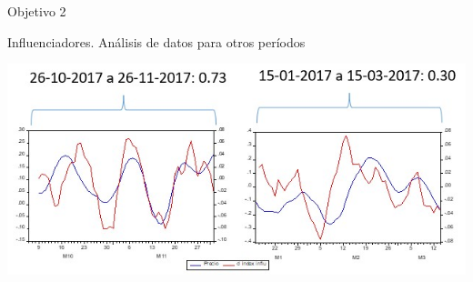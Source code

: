 
\begin{frame}
\huge
\centering
    Objetivo 2
\end{frame}

\begin{frame}{Influenciadores. Análisis de datos para otros períodos}
        \begin{center}
         \includegraphics[width=1\textwidth]{images/C2/otros periodos.jpg}
         \end{center}
    \end{frame}
